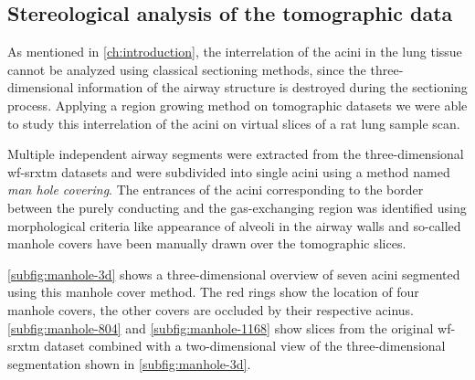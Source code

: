 \subsection{Stereological analysis of the tomographic data\label{subsec:stereological analysis}}
As mentioned in \autoref{ch:introduction}, the interrelation of the acini in the lung tissue cannot be analyzed using classical sectioning methods, since the three-dimensional information of the airway structure is destroyed during the sectioning process. Applying a region growing method on tomographic datasets we were able to study this interrelation of the acini on virtual slices of a rat lung sample scan.

Multiple independent airway segments were extracted from the three-dimensional \ac{wf-srxtm} datasets and were subdivided into single acini using a method named \emph{man hole covering}. The entrances of the acini corresponding to the border between the purely conducting and the gas-exchanging region was identified using morphological criteria like appearance of alveoli in the airway walls and so-called manhole covers have been manually drawn over the tomographic slices. 

\autoref{subfig:manhole-3d} shows a three-dimensional overview of seven acini segmented using this manhole cover method. The red rings show the location of four manhole covers, the other covers are occluded by their respective acinus. \autoref{subfig:manhole-804} and \ref{subfig:manhole-1168} show slices from the original \ac{wf-srxtm} dataset combined with a two-dimensional view of the three-dimensional segmentation shown in \autoref{subfig:manhole-3d}.

